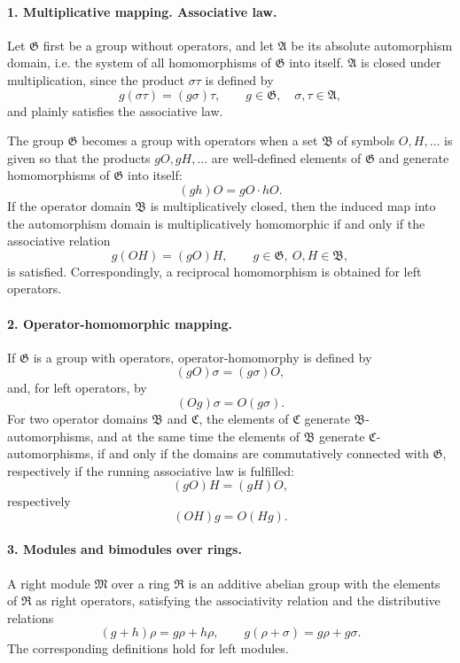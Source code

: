 \documentclass[11pt]{article}
\providecommand{\frR}{\mathfrak R}
\providecommand{\frM}{\mathfrak M}
\providecommand{\frA}{\mathfrak A}
\providecommand{\frB}{\mathfrak B}
\providecommand{\frG}{\mathfrak G}
\providecommand{\frC}{\mathfrak C}
\begin{document}
\paragraph{1. Multiplicative mapping. Associative law.}
Let \(\frG\) first be a group without operators, and let \(\frA\) be its absolute automorphism domain, i.e. the system of all homomorphisms of \(\frG\) into itself. \(\frA\) is closed under multiplication, since the product \(\sigma\tau\) is defined by
\[
        g(\sigma\tau)=(g\sigma)\tau,
        \qquad g\in\frG,\quad \sigma,\tau\in\frA,                       \tag{1}
\]
and plainly satisfies the associative law.

The group \(\frG\) becomes a group with operators when a set \(\frB\) of symbols \(O,H,\ldots\) is given so that the products \(gO,gH,\ldots\) are well-defined elements of \(\frG\) and generate homomorphisms of \(\frG\) into itself:
\[
        (gh)O=gO\cdot hO.
\]
If the operator domain \(\frB\) is multiplicatively closed, then the induced map into the automorphism domain is multiplicatively homomorphic if and only if the associative relation
\[
        g(OH)=(gO)H,\qquad g\in\frG,\ O,H\in\frB,                       \tag{1a}
\]
is satisfied. Correspondingly, a reciprocal homomorphism is obtained for left operators.

\paragraph{2. Operator-homomorphic mapping.}
If \(\frG\) is a group with operators, operator-homomorphy is defined by
\[
        (gO)\sigma=(g\sigma)O,                                          \tag{2}
\]
and, for left operators, by
\[
        (Og)\sigma=O(g\sigma).                                          \tag{2*}
\]
For two operator domains \(\frB\) and \(\frC\), the elements of \(\frC\) generate \(\frB\)-automorphisms, and at the same time the elements of \(\frB\) generate \(\frC\)-automorphisms, if and only if the domains are commutatively connected with \(\frG\), respectively if the running associative law is fulfilled:
\[
        (gO)H=(gH)O,                                                    \tag{2a}
\]
respectively
\[
        (OH)g=O(Hg).                                                    \tag{2a*}
\]

\paragraph{3. Modules and bimodules over rings.}
A right module \(\frM\) over a ring \(\frR\) is an additive abelian group with the elements of \(\frR\) as right operators, satisfying the associativity relation and the distributive relations
\[
        (g+h)\rho=g\rho+h\rho,\qquad
        g(\rho+\sigma)=g\rho+g\sigma.                                  \tag{3a}
\]
The corresponding definitions hold for left modules.
\end{document}
